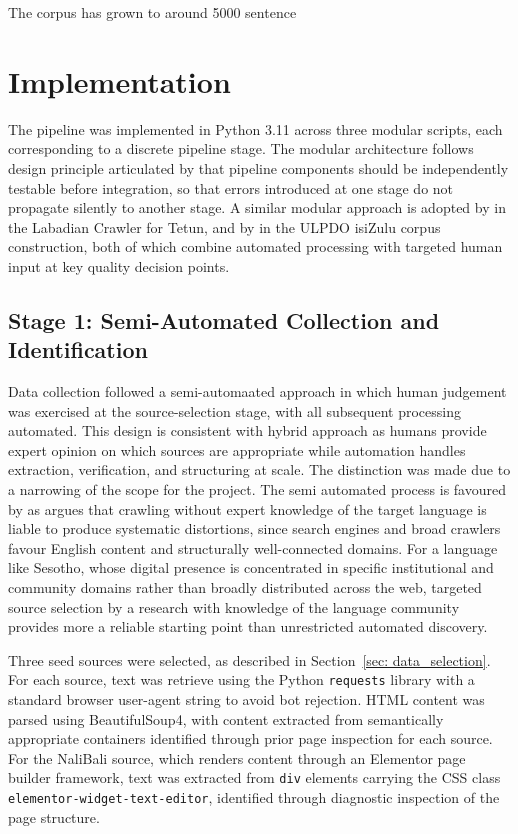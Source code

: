 \documentclass[11pt,a4paper]{article}
\begin{document}
The corpus has grown to around 5000 sentence


\section{Implementation}
The pipeline was implemented in Python 3.11 across three modular scripts, each corresponding to a discrete pipeline stage. The modular architecture follows design principle articulated by \citet{suchomel2020better} that pipeline components should be independently testable before integration, so that errors introduced at one stage do not propagate silently to another stage. A similar modular approach is adopted by \citet{de2024data} in the Labadian Crawler for Tetun, and by \citet{gumede2025creating} in the ULPDO isiZulu corpus construction, both of which combine automated processing with targeted human input at key quality decision points.

\subsection{Stage 1: Semi-Automated Collection and Identification}
Data collection followed a semi-automaated approach in which  human judgement was exercised at the source-selection stage, with all subsequent processing automated. This design is consistent with \citet{gumede2025creating} hybrid approach as humans provide expert opinion on which sources are appropriate while automation handles extraction, verification, and structuring at scale. The distinction was made due to a narrowing of the scope for the project. The semi automated process is favoured by \citet{barbaresi2013challenges} as \citet{barbaresi2013challenges} argues that crawling without expert knowledge of the target language is liable to produce systematic distortions, since search engines and broad crawlers favour English content and structurally well-connected domains. For a language like Sesotho, whose digital presence is concentrated in specific institutional and community domains rather than broadly distributed across the web, targeted source selection by a research with knowledge of the language community provides more a reliable starting point than unrestricted automated discovery.

Three seed sources were selected, as described in Section~\ref{sec: data_selection}. For each source, text was retrieve using the Python \texttt{requests} library with a standard browser user-agent string to avoid bot rejection. HTML content was parsed using BeautifulSoup4, with content extracted from semantically appropriate containers identified through prior page inspection for each source. For the NaliBali source, which renders content through an Elementor page builder framework, text was extracted from \texttt{div} elements carrying the CSS class \texttt{elementor-widget-text-editor}, identified through diagnostic inspection of the page structure. 
\end{document}
